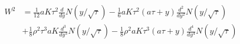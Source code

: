 \documentclass[10pt]{article}
\numberwithin{equation}{section}
\begin{document}
\begin{equation*}
	\begin{split}
	W^{2}&= \frac{1}{12} a K \tau^2 \frac{d}{d y} N(y/\sqrt{\tau}) -\frac{1}{6} a K \tau^2 (a\tau + y) \frac{d^2}{d y^2} N(y/\sqrt{\tau})\\
	& +\frac{1}{8} \rho^2 \tau^3 a K \frac{d^3}{d y^3} N(y/\sqrt{\tau}) - \frac{1}{8} \rho^2 a K \tau^3 ( a\tau + y )  \frac{d^4}{d y^4} N(y/\sqrt{\tau})
	\end{split}
\end{equation*}


\end{document}
